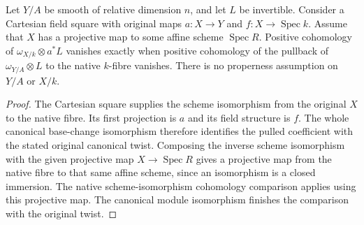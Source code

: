 \begin{lemma}
\label{lem:relative-original-canonical-square-cohomology}
\leanok
Let $Y/A$ be smooth of relative dimension $n$, and let $L$ be invertible.
Consider a Cartesian field square with original maps $a:X\to Y$ and
$f:X\to\operatorname{Spec}k$. Assume that $X$ has a projective map to
some affine scheme $\operatorname{Spec}R$. Positive cohomology of
$\omega_{X/k}\otimes a^*L$ vanishes exactly when positive cohomology of
the pullback of $\omega_{Y/A}\otimes L$ to the native $k$-fibre vanishes.
There is no properness assumption on $Y/A$ or $X/k$.
\end{lemma}
\begin{proof}
The Cartesian square supplies the scheme isomorphism from the original
$X$ to the native fibre. Its first projection is $a$ and its field
structure is $f$. The whole canonical base-change isomorphism therefore
identifies the pulled coefficient with the stated original canonical
twist. Composing the inverse scheme isomorphism with the given projective
map $X\to\operatorname{Spec}R$ gives a projective map from the native
fibre to that same affine scheme, since an isomorphism is a closed
immersion. The native scheme-isomorphism cohomology comparison applies
using this projective map. The canonical module isomorphism finishes the
comparison with the original twist.
\end{proof}
